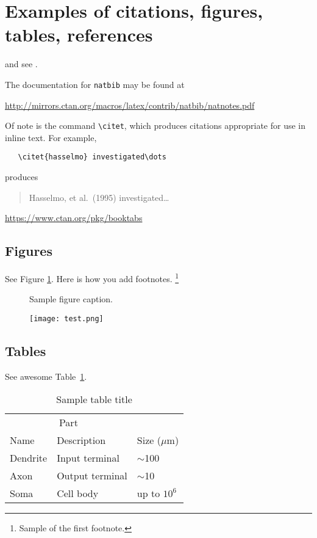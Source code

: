 \documentclass{article}
\begin{document}
\section{Examples of citations, figures, tables, references}
\label{sec:others}
\lipsum[8] \cite{kour2014real,kour2014fast} and see \cite{hadash2018estimate}.

The documentation for \verb+natbib+ may be found at
\begin{center}
  \url{http://mirrors.ctan.org/macros/latex/contrib/natbib/natnotes.pdf}
\end{center}
Of note is the command \verb+\citet+, which produces citations
appropriate for use in inline text.  For example,
\begin{verbatim}
   \citet{hasselmo} investigated\dots
\end{verbatim}
produces
\begin{quote}
  Hasselmo, et al.\ (1995) investigated\dots
\end{quote}

\begin{center}
  \url{https://www.ctan.org/pkg/booktabs}
\end{center}


\subsection{Figures}
\lipsum[10] 
See Figure \ref{fig:fig1}. Here is how you add footnotes. \footnote{Sample of the first footnote.}
\lipsum[11] 

\begin{figure}
  \centering
  \fbox{\rule[-.5cm]{4cm}{4cm} \rule[-.5cm]{4cm}{0cm}}
  \caption{Sample figure caption.}
  \label{fig:fig1}
\end{figure}

\begin{figure} %
    \centering
    \texttt{[image: test.png]}
\end{figure}

\subsection{Tables}
\lipsum[12]
See awesome Table~\ref{tab:table}.

\begin{table}
 \caption{Sample table title}
  \centering
  \begin{tabular}{lll}
    \toprule
    \multicolumn{2}{c}{Part}                   \\
    \cmidrule(r){1-2}
    Name     & Description     & Size ($\mu$m) \\
    \midrule
    Dendrite & Input terminal  & $\sim$100     \\
    Axon     & Output terminal & $\sim$10      \\
    Soma     & Cell body       & up to $10^6$  \\
    \bottomrule
  \end{tabular}
  \label{tab:table}
\end{table}
\end{document}

